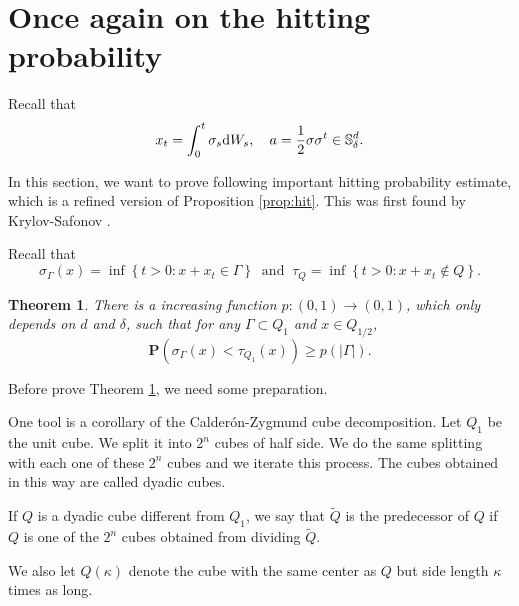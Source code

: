 \documentclass[twoside, 12pt]{book}
\numberwithin{equation}{chapter}
\newtheorem{theorem}{Theorem}[section]
\def\mS{{\mathbb S}}
\def\bP{{\mathbf P}}
\def\l{\left}
\def\r{\right}
\def\geq{\geqslant}
\def\d{\text{\rm{d}}}
\begin{document}
	\section{Once again on the hitting probability}
	Recall that 
	\[
	x_t=\int_0^t \sigma_s \d W_s, \quad a=\frac{1}{2}\sigma \sigma^t \in \mS^d_\delta. 
	\]
	
	In this section, we want to prove following important hitting probability estimate, which is a refined version of Proposition \ref{prop:hit}. This was first found by Krylov-Safonov \cite{krylov1979estimate}. 
	
	Recall that 
	\[
	    \sigma_{\Gamma}(x)= \inf\l\{t>0: x+x_t\in \Gamma\r\} ~\mbox{ and }~ \tau_Q= \inf\l\{t>0: x+x_t\notin Q\r\}. 
	\]
	\begin{theorem}\label{thm:hit}
		There is a increasing function $p: (0,1)\to (0,1)$, which only depends on $d$ and $\delta$, such that for any $\Gamma \subset Q_1$ and $x\in Q_{1/2}$,  
		\begin{equation}
			\bP (\sigma_\Gamma(x)<\tau_{Q_1}(x)) \geq p(|\Gamma|). 
		\end{equation}
	\end{theorem}
	
	Before prove Theorem \ref{thm:hit}, we need some preparation.  
	
	One tool is a corollary of the Calderón-Zygmund cube decomposition. Let $Q_1$ be the unit cube. We split it into $2^n$ cubes of half side. We do the same splitting with each one of these $2^n$ cubes and we iterate this process. The cubes obtained in this way are called dyadic cubes. 
	
	If $Q$ is a dyadic cube different from $Q_1$, we say that $\widetilde{Q}$ is the predecessor of $Q$ if $Q$ is one of the $2^n$ cubes obtained from dividing $\widetilde{Q}$.
	
	We also let $Q(\kappa)$ denote the cube with the same center as $Q$ but side length $\kappa$ times as long.
	
\end{document}
